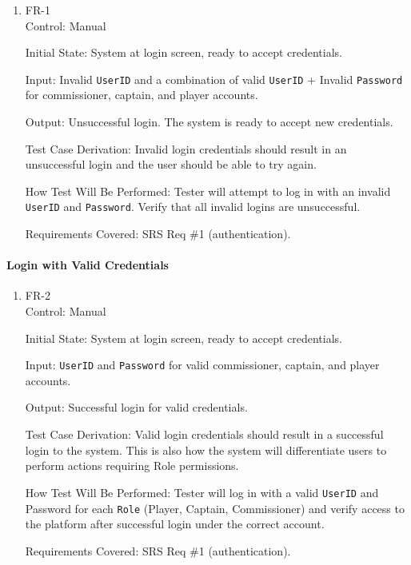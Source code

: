 \documentclass[12pt, titlepage]{article}
\begin{document}
\begin{enumerate}
\item{FR-1\\}
Control: Manual

Initial State: System at login screen, ready to accept credentials.

Input: Invalid \texttt{UserID} and a combination of valid \texttt{UserID} + Invalid \texttt{Password} for commissioner, captain, and player accounts.

Output: Unsuccessful login. The system is ready to accept new credentials.

Test Case Derivation: Invalid login credentials should result in an unsuccessful login and the user should be able to try again.

How Test Will Be Performed: Tester will attempt to log in with an invalid \texttt{UserID} and \texttt{Password}. Verify that all invalid logins are unsuccessful.

Requirements Covered: SRS Req \#1 (authentication).
\end{enumerate}

\paragraph{Login with Valid Credentials}

\begin{enumerate}

\item{FR-2\\}
Control: Manual

Initial State: System at login screen, ready to accept credentials.

Input: \texttt{UserID} and \texttt{Password} for valid commissioner, captain, and player accounts.

Output: Successful login for valid credentials.

Test Case Derivation: Valid login credentials should result in a successful login to the system. This is also how the system will differentiate users to perform actions requiring Role permissions.

How Test Will Be Performed: Tester will log in with a valid \texttt{UserID} and Password for each \texttt{Role} (Player, Captain, Commissioner) and verify access to the platform after successful login under the correct account.

Requirements Covered: SRS Req \#1 (authentication).
\end{enumerate}
\end{document}
